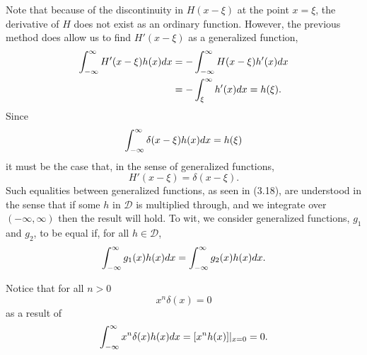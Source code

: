 Note that because of the discontinuity in \(H(x-\xi)\) at the point \(x=\xi\), the derivative of \(H\) does not exist as an ordinary function. However, the previous method does allow us to find \(H'(x-\xi)\) as a generalized function, 
\begin{equation}
    \begin{split}
        \int_{-\infty}^{\infty} H'(x-\xi)h(x)dx &= -\int_{-\infty}^{\infty} H(x-\xi)h'(x)dx\\
        &=-\int_{\xi}^{\infty}h'(x)dx = h(\xi).
    \end{split}
\end{equation}
Since
\begin{equation}
    \int_{-\infty}^{\infty} \delta(x-\xi)h(x)dx=h(\xi)
\end{equation}
it must be the case that, in the sense of generalized functions,
\begin{equation}
    H'(x-\xi) = \delta(x-\xi).
\end{equation}
Such equalities between generalized functions, as seen in (3.18), are understood in the sense that if some \(h\) in \(\mathcal{D}\) is multiplied through, and we integrate over \((-\infty, \infty)\) then the result will hold. To wit, we consider generalized functions, \(g_1\) and \(g_2\), to be equal if, for all \(h\in \mathcal{D}\),
\begin{equation}
    \int_{-\infty}^{\infty} g_1(x)h(x)dx = \int_{-\infty}^{\infty} g_2(x)h(x)dx.
\end{equation}

Notice that for all \(n > 0\)
\begin{equation}
    x^n\delta(x)=0
\end{equation}
as a result of
\begin{equation}
    \int_{-\infty}^{\infty} x^n\delta(x)h(x)dx=[x^nh(x)]|_{x=0} = 0.
\end{equation}



